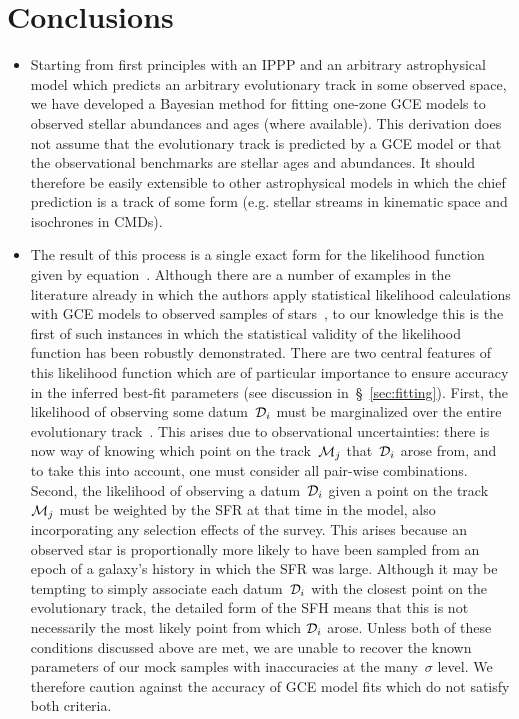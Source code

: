 \documentclass[ms.tex]{subfiles}
\begin{document}
\section{Conclusions}
\label{sec:conclusions}

\begin{itemize}

	\item Starting from first principles with an IPPP and an arbitrary
	astrophysical model which predicts an arbitrary evolutionary track in some
	observed space, we have developed a Bayesian method for fitting one-zone
	GCE models to observed stellar abundances and ages (where available).
	This derivation does not assume that the evolutionary track is predicted by
	a GCE model or that the observational benchmarks are stellar ages and
	abundances.
	It should therefore be easily extensible to other astrophysical models in
	which the chief prediction is a track of some form (e.g. stellar streams
	in kinematic space and isochrones in CMDs).
	
	\item The result of this process is a single exact form for the likelihood
	function given by equation~.
	Although there are a number of examples in the literature already in which
	the authors apply statistical likelihood calculations with GCE models to
	observed samples of stars~\citep[e.g.][]{Spitoni2020, Spitoni2021,
	Hasselquist2021}, to our knowledge this is the first of such instances in
	which the statistical validity of the likelihood function has been robustly
	demonstrated.
	There are two central features of this likelihood function which are of
	particular importance to ensure accuracy in the inferred best-fit
	parameters (see discussion in~\S~\ref{sec:fitting}).
	First, the likelihood of observing some datum~$\mathcal{D}_i$ must be
	marginalized over the entire evolutionary track~.
	This arises due to observational uncertainties: there is now way of knowing
	which point on the track~$\mathcal{M}_j$ that~$\mathcal{D}_i$ arose from,
	and to take this into account, one must consider all pair-wise combinations.
	Second, the likelihood of observing a datum~$\mathcal{D}_i$ given a point
	on the track~$\mathcal{M}_j$ must be weighted by the SFR at that time in
	the model, also incorporating any selection effects of the survey.
	This arises because an observed star is proportionally more likely to have
	been sampled from an epoch of a galaxy's history in which the SFR was large.
	Although it may be tempting to simply associate each datum~$\mathcal{D}_i$
	with the closest point on the evolutionary track, the detailed form of the
	SFH means that this is not necessarily the most likely point from which
	$\mathcal{D}_i$ arose.
	Unless both of these conditions discussed above are met, we are unable
	to recover the known parameters of our mock samples with inaccuracies
	at the many~$\sigma$ level.
	We therefore caution against the accuracy of GCE model fits which do not
	satisfy both criteria.


\end{itemize}
\end{document}
